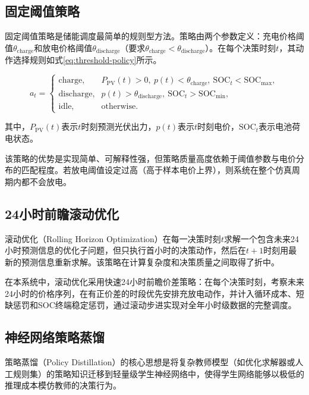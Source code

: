 \documentclass[12pt,a4paper]{ctexbook}
\begin{document}
\subsection{固定阈值策略}

固定阈值策略是储能调度最简单的规则型方法。策略由两个参数定义：充电价格阈值$\theta_{\text{charge}}$和放电价格阈值$\theta_{\text{discharge}}$（要求$\theta_{\text{charge}} < \theta_{\text{discharge}}$）。在每个决策时刻$t$，其动作选择规则如式\ref{eq:threshold-policy}所示。

\begin{equation}
a_t =
\begin{cases}
\text{charge}, & P_{\text{PV}}(t)>0,\ p(t)<\theta_{\text{charge}},\ \text{SOC}_t<\text{SOC}_{\max},\\
\text{discharge}, & p(t)>\theta_{\text{discharge}},\ \text{SOC}_t>\text{SOC}_{\min},\\
\text{idle}, & \text{otherwise}.
\end{cases}
\label{eq:threshold-policy}
\end{equation}

其中，$P_{\text{PV}}(t)$表示$t$时刻预测光伏出力，$p(t)$表示$t$时刻电价，$\text{SOC}_t$表示电池荷电状态。

该策略的优势是实现简单、可解释性强，但策略质量高度依赖于阈值参数与电价分布的匹配程度。若放电阈值设定过高（高于样本电价上界），则系统在整个仿真周期内都不会放电。

\subsection{24小时前瞻滚动优化}

滚动优化（Rolling Horizon Optimization）在每一决策时刻$t$求解一个包含未来24小时预测信息的优化子问题，但只执行首小时的决策动作，然后在$t+1$时刻用最新的预测信息重新求解。该策略在计算复杂度和决策质量之间取得了折中。

在本系统中，滚动优化采用快速24小时前瞻价差策略：在每个决策时刻，考察未来24小时的价格序列，在有正价差的时段优先安排充放电动作，并计入循环成本、短缺惩罚和SOC终端稳定惩罚，通过滚动步进实现对全年小时级数据的完整调度。

\subsection{神经网络策略蒸馏}

策略蒸馏（Policy Distillation）\cite{policy-distillation-2016}的核心思想是将复杂教师模型（如优化求解器或人工规则集）的策略知识迁移到轻量级学生神经网络中，使得学生网络能够以极低的推理成本模仿教师的决策行为。
\end{document}
